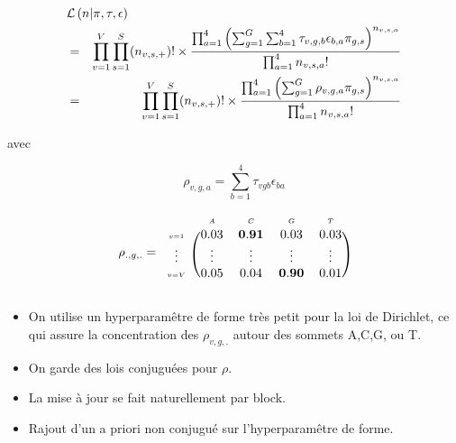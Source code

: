 \documentclass{beamer}
\begin{document}
\begin{frame}


\begin{eqnarray*}\lefteqn{\mathcal{L}\left(n | \pi, \tau,\epsilon \right)}\nonumber\\& =& \prod_{v=1}^{V} \prod_{s = 1}^{S} (n_{v,s,+})!\times\frac{\prod_{a = 1}^{4} \left( \sum_{g = 1}^{G}\sum_{b=1}^{4} \tau_{v,g,b}\epsilon_{b,a} \pi_{g,s}  \right)^{n_{v,s,a}}}{\prod_{a = 1}^{4}n_{v,s,a}!}\nonumber\\
& =&\prod_{v=1}^{V} \prod_{s = 1}^{S} (n_{v,s,+})!\times\frac{\prod_{a = 1}^{4} \left( \sum_{g = 1}^{G} \rho_{v,g,a} \pi_{g,s}  \right)^{n_{v,s,a}}}{\prod_{a = 1}^{4}n_{v,s,a}!}\end{eqnarray*}

avec

$$\rho_{v,g,a}=\sum_{b=1}^4\tau_{vgb}\epsilon_{ba}$$
\end{frame}
\begin{frame}
 $$\rho_{.,g,.}=\begin{blockarray}{ccccc}
    &\scriptscriptstyle A&\scriptscriptstyle C&\scriptscriptstyle G&\scriptscriptstyle T\\
    \begin{block}{c(cccc)}
 {\scriptscriptstyle v=1}&0.03&\mathbf{0.91}&0.03&0.03\\   
 {\scriptscriptstyle 
 \vdots}&\vdots&\vdots&\vdots&\vdots\\   
  {\scriptscriptstyle 
 v=V}&0.05&0.04&\mathbf{0.90}&0.01\\   
    \end{block}
\end{blockarray} $$
\begin{itemize}
\item On utilise un hyperparamêtre de forme très petit pour la loi de Dirichlet, ce qui assure la concentration des $\rho_{v,g,.}$ autour des sommets A,C,G, ou T.
\item On garde des lois conjuguées pour $\rho$.
\item La mise à jour se fait naturellement par block.
\item Rajout d'un a priori non conjugué sur l'hyperparamêtre de forme.
\end{itemize}
\end{frame}


\begin{frame}[fragile]

\end{frame}
\end{document}
